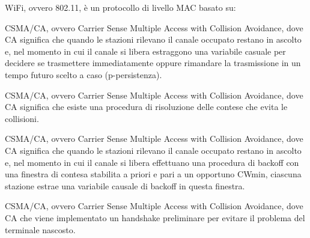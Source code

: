 \question
WiFi, ovvero 802.11, è un protocollo di livello MAC basato su:

\begin{checkboxes}
	\choice CSMA/CA, ovvero Carrier Sense Multiple Access with Collision Avoidance, dove CA significa che quando le stazioni rilevano il canale occupato restano in ascolto e, nel momento in cui il canale si libera estraggono una variabile casuale per decidere se trasmettere immediatamente oppure rimandare la trasmissione in un tempo futuro scelto a caso (p-persistenza).

	\choice CSMA/CA, ovvero Carrier Sense Multiple Access with Collision Avoidance, dove CA significa che esiste una procedura di risoluzione delle contese che evita le collisioni.

	\CorrectChoice CSMA/CA, ovvero Carrier Sense Multiple Access with Collision Avoidance, dove CA significa che quando le stazioni rilevano il canale occupato restano in ascolto e, nel momento in cui il canale si libera effettuano una procedura di backoff con una finestra di contesa stabilita a priori e pari a un opportuno CWmin, ciascuna stazione estrae una variabile causale di backoff in questa finestra.

	\choice CSMA/CA, ovvero Carrier Sense Multiple Access with Collision Avoidance, dove CA che viene implementato un handshake preliminare per evitare il problema del terminale nascosto.
\end{checkboxes}
